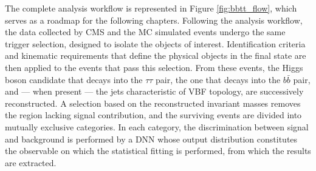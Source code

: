The complete analysis workflow is represented in Figure \ref{fig:bbtt_flow}, which serves as a roadmap for the following chapters. Following the analysis workflow, the data collected by CMS and the MC simulated events undergo the same trigger selection, designed to isolate the objects of interest. Identification criteria and kinematic requirements that define the physical objects in the final state are then applied to the events that pass this selection. From these events, the Higgs boson candidate that decays into the $\tau\tau$ pair, the one that decays into the $b\bar{b}$ pair, and — when present — the jets characteristic of VBF topology, are successively reconstructed. A selection based on the reconstructed invariant masses removes the region lacking signal contribution, and the surviving events are divided into mutually exclusive categories. In each category, the discrimination between signal and background is performed by a DNN whose output distribution constitutes the observable on which the statistical fitting is performed, from which the results are extracted.
%
